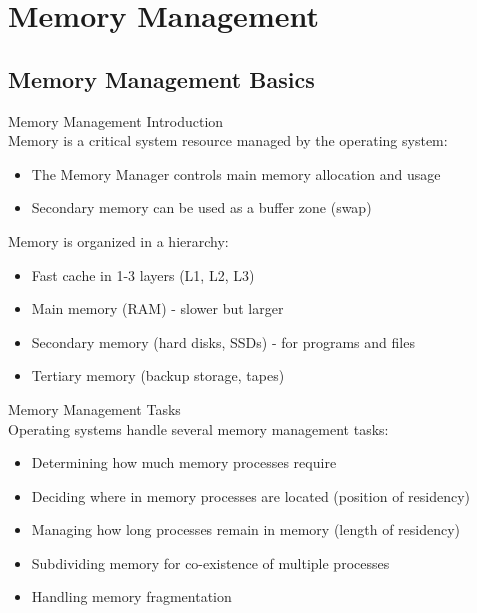 \section{Memory Management}

\subsection{Memory Management Basics}

\begin{definition}{Memory Management Introduction}\\
    Memory is a critical system resource managed by the operating system:
    \begin{itemize}
        \item The Memory Manager controls main memory allocation and usage
        \item Secondary memory can be used as a buffer zone (swap)
    \end{itemize}
    
    Memory is organized in a hierarchy:
    \begin{itemize}
        \item Fast cache in 1-3 layers (L1, L2, L3)
        \item Main memory (RAM) - slower but larger
        \item Secondary memory (hard disks, SSDs) - for programs and files
        \item Tertiary memory (backup storage, tapes)
    \end{itemize}
\end{definition}

\begin{definition}{Memory Management Tasks}\\
    Operating systems handle several memory management tasks:
    \begin{itemize}
        \item Determining how much memory processes require
        \item Deciding where in memory processes are located (position of residency)
        \item Managing how long processes remain in memory (length of residency)
        \item Subdividing memory for co-existence of multiple processes
        \item Handling memory fragmentation
    \end{itemize}
\end{definition}

